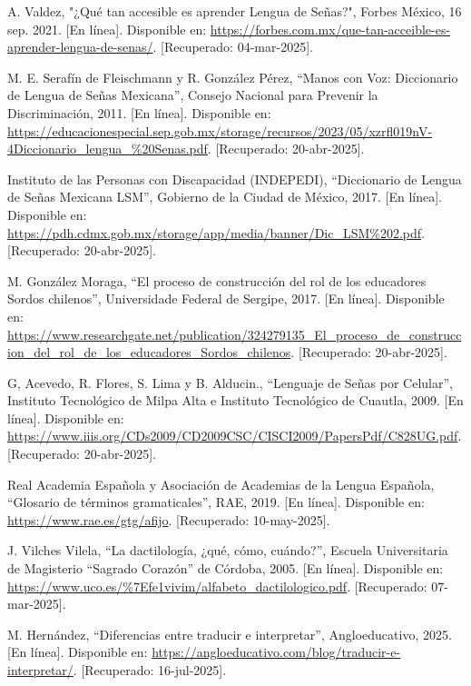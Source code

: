 \begin{thebibliography}{200}
    A. Valdez, "¿Qué tan accesible es aprender Lengua de Señas?", Forbes México, 16 sep. 2021. [En línea]. Disponible en: \url{https://forbes.com.mx/que-tan-acceible-es-aprender-lengua-de-senas/}. [Recuperado: 04-mar-2025].

    M. E. Serafín de Fleischmann y R. González Pérez, “Manos con Voz: Diccionario de Lengua de Señas Mexicana”, Consejo Nacional para Prevenir la Discriminación, 2011. [En línea]. Disponible en: \url{https://educacionespecial.sep.gob.mx/storage/recursos/2023/05/xzrfl019nV-4Diccionario_lengua_%20Senas.pdf}. [Recuperado: 20-abr-2025].

    Instituto de las Personas con Discapacidad (INDEPEDI), “Diccionario de Lengua de Señas Mexicana LSM”, Gobierno de la Ciudad de México, 2017. [En línea]. Disponible en: \url{https://pdh.cdmx.gob.mx/storage/app/media/banner/Dic_LSM%202.pdf}. [Recuperado: 20-abr-2025].

    M. González Moraga, “El proceso de construcción del rol de los educadores Sordos chilenos”, Universidade Federal de Sergipe, 2017. [En línea]. Disponible en: \url{https://www.researchgate.net/publication/324279135_El_proceso_de_construccion_del_rol_de_los_educadores_Sordos_chilenos}. [Recuperado: 20-abr-2025].

    G, Acevedo, R. Flores, S. Lima y B. Alducin., “Lenguaje de Señas por Celular”, Instituto Tecnológico de Milpa Alta e Instituto Tecnológico de Cuautla, 2009. [En línea]. Disponible en: \url{https://www.iiis.org/CDs2009/CD2009CSC/CISCI2009/PapersPdf/C828UG.pdf}. [Recuperado: 20-abr-2025].

    Real Academia Española y Asociación de Academias de la Lengua Española, “Glosario de términos gramaticales”, RAE, 2019. [En línea]. Disponible en: \url{https://www.rae.es/gtg/afijo}. [Recuperado: 10-may-2025].

    J. Vilches Vilela, “La dactilología, ¿qué, cómo, cuándo?”, Escuela Universitaria de Magisterio “Sagrado Corazón” de Córdoba, 2005. [En línea]. Disponible en: \url{https://www.uco.es/%7Efe1vivim/alfabeto_dactilologico.pdf}. [Recuperado: 07-mar-2025].

    M. Hernández, “Diferencias entre traducir e interpretar”, Angloeducativo, 2025. [En línea]. Disponible en: \url{https://angloeducativo.com/blog/traducir-e-interpretar/}. [Recuperado: 16-jul-2025].


\end{thebibliography}
